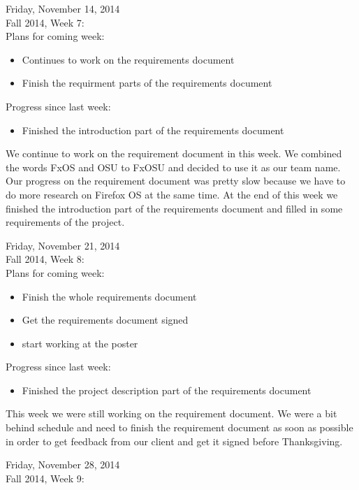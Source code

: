Friday, November 14, 2014 \\
​Fall 2014, Week 7: \\

Plans for coming week:
\begin{itemize}
\item Continues to work on the requirements document
\item Finish the requirment parts of the requirements document
\end{itemize}

​Progress since last week:​
\begin{itemize}
\item Finished the introduction part of the requirements document​
\end{itemize}

We continue to work on the requirement document in this week. We combined the words FxOS and OSU to FxOSU and decided to use it as our team name. Our progress on the requirement document was pretty slow because we have to do more research on Firefox OS at the same time. At the end of this week we finished the introduction part of the requirements document​ and filled in some requirements of the project.​

Friday, November 21, 2014 \\
Fall 2014, Week 8: \\

Plans for coming week:
\begin{itemize}
\item Finish the whole requirements document​
\item Get the requirements document signed
\item start working at​ the poster
​\end{itemize}

Progress since last week:​
\begin{itemize}
\item Finished the project description part of the requirements document​
\end{itemize}

This week we were still working on the requirement document. We were a bit behind schedule and need to finish the requirement document as soon as possible in order to get feedback from our client and get it signed before Thanksgiving.

Friday, November 28, 2014 \\
​Fall 2014, Week 9: \\

